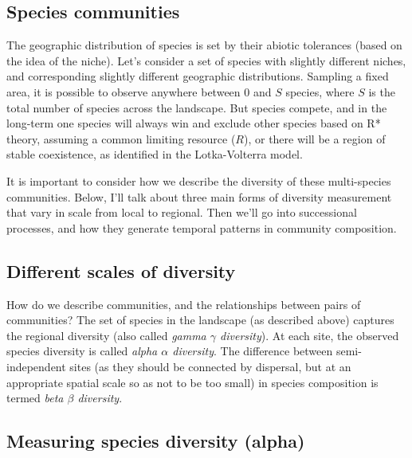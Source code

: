 \documentclass[12pt]{article}
\begin{document}
\clearpage

\subsection*{Species communities}

The geographic distribution of species is set by their abiotic tolerances (based on the idea of the niche). Let's consider a set of species with slightly different niches, and corresponding slightly different geographic distributions. Sampling a fixed area, it is possible to observe anywhere between 0 and $S$ species, where $S$ is the total number of species across the landscape. But species compete, and in the long-term one species will always win and exclude other species based on R* theory, assuming a common limiting resource ($R$), or there will be a region of stable coexistence, as identified in the Lotka-Volterra model. 



It is important to consider how we describe the diversity of these multi-species communities. Below, I'll talk about three main forms of diversity measurement that vary in scale from local to regional. Then we'll go into successional processes, and how they generate temporal patterns in community composition.  







\bigskip




\subsection*{Different scales of diversity}

How do we describe communities, and the relationships between pairs of communities? The set of species in the landscape (as described above) captures the regional diversity (also called \textit{gamma $\gamma$ diversity}). At each site, the observed species diversity is called \textit{alpha $\alpha$ diversity}. The difference between semi-independent sites (as they should be connected by dispersal, but at an appropriate spatial scale so as not to be too small) in species composition is termed \textit{beta $\beta$ diversity}.








\subsection*{Measuring species diversity (alpha)}
\end{document}
